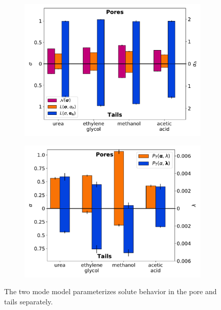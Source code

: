 \documentclass[12pt]{article}
\begin{document}
  \begin{figure}
  \centering
  \begin{subfigure}{0.475\textwidth}
  \includegraphics[width=\textwidth]{2mode_AD_hops.pdf}
  \caption{}\label{fig:2mode_AD_hops}
  \end{subfigure}
  \begin{subfigure}{0.475\textwidth}
  \includegraphics[width=\textwidth]{2mode_AD_dwells.pdf}
  \caption{}\label{fig:2mode_AD_dwells}
  \end{subfigure}
  \caption{
  The two mode model parameterizes solute behavior in the pore and tails separately.
}
\end{figure}
\end{document}
